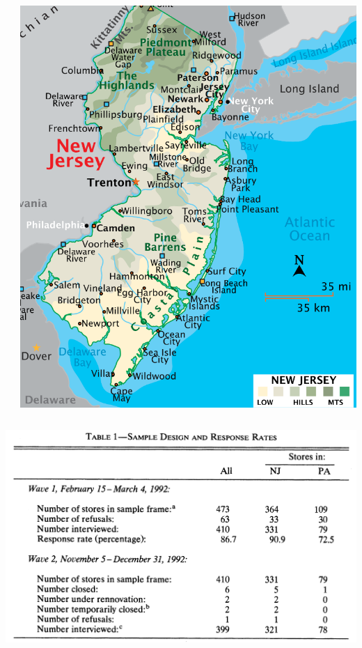 \documentclass[aspectratio=169]{beamer}
\theoremstyle{principle}
\begin{document}
\begin{frame}
\begin{columns}
\begin{column}{0.5\textwidth}
\end{column}
\begin{column}{0.5\textwidth}
\begin{center}
\includegraphics[scale=0.4]{nj_map.png}
\end{center}
\end{column}
\end{columns}

\end{frame}

\begin{frame}

\begin{center}
\includegraphics[scale=0.4]{response_rates.png}
\end{center}

\end{frame}
\end{document}
